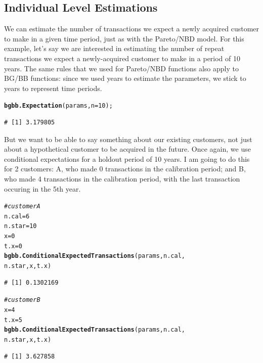 \documentclass[10pt, letterpaper, onecolumn, oneside, final]{article}\usepackage[]{graphicx}\usepackage[]{color}
\makeatletter
\newcommand{\hlnum}[1]{\textcolor[rgb]{0.686,0.059,0.569}{#1}}%
\newcommand{\hlcom}[1]{\textcolor[rgb]{0.678,0.584,0.686}{\textit{#1}}}%
\newcommand{\hlstd}[1]{\textcolor[rgb]{0.345,0.345,0.345}{#1}}%
\newcommand{\hlkwb}[1]{\textcolor[rgb]{0.69,0.353,0.396}{#1}}%
\newcommand{\hlkwc}[1]{\textcolor[rgb]{0.333,0.667,0.333}{#1}}%
\newcommand{\hlkwd}[1]{\textcolor[rgb]{0.737,0.353,0.396}{\textbf{#1}}}%
\newenvironment{kframe}{%
 \def\at@end@of@kframe{}%
 \ifinner\ifhmode%
  \def\at@end@of@kframe{\end{minipage}}%
  \begin{minipage}{\columnwidth}%
 \fi\fi%
 \def\FrameCommand##1{\hskip\@totalleftmargin \hskip-\fboxsep
 \colorbox{shadecolor}{##1}\hskip-\fboxsep
     \hskip-\linewidth \hskip-\@totalleftmargin \hskip\columnwidth}%
 \MakeFramed {\advance\hsize-\width
   \@totalleftmargin\z@ \linewidth\hsize
   \@setminipage}}%
 {\par\unskip\endMakeFramed%
 \at@end@of@kframe}
\newenvironment{knitrout}{}{} %
\makeatother
\begin{document}
\subsection{Individual Level Estimations}

We can estimate the number of transactions we expect a newly acquired
customer to make in a given time period, just as with the Pareto/NBD
model. For this example, let's say we are interested in estimating the
number of repeat transactions we expect a newly-acquired customer to
make in a period of 10 years. The same rules that we used for
Pareto/NBD functions also apply to BG/BB functions: since we used
years to estimate the parameters, we stick to years to represent time
periods.
\begin{knitrout}
\color{fgcolor}\begin{kframe}
\begin{alltt}
\hlkwd{bgbb.Expectation}\hlstd{(params,} \hlkwc{n}\hlstd{=}\hlnum{10}\hlstd{);}
\end{alltt}
\begin{verbatim}
# [1] 3.179805
\end{verbatim}
\end{kframe}
\end{knitrout}


But we want to be able to say something about our existing customers,
not just about a hypothetical customer to be acquired in the
future. Once again, we use conditional expectations for a holdout
period of 10 years. I am going to do this for 2 customers: A, who made
0 transactions in the calibration period; and B, who made 4
transactions in the calibration period, with the last transaction
occuring in the 5th year.

\begin{knitrout}
\color{fgcolor}\begin{kframe}
\begin{alltt}
\hlcom{# customer A}
\hlstd{n.cal} \hlkwb{=} \hlnum{6}
\hlstd{n.star} \hlkwb{=} \hlnum{10}
\hlstd{x} \hlkwb{=} \hlnum{0}
\hlstd{t.x} \hlkwb{=} \hlnum{0}
\hlkwd{bgbb.ConditionalExpectedTransactions}\hlstd{(params, n.cal,}
                                     \hlstd{n.star, x, t.x)}
\end{alltt}
\begin{verbatim}
# [1] 0.1302169
\end{verbatim}
\begin{alltt}
\hlcom{# customer B}
\hlstd{x} \hlkwb{=} \hlnum{4}
\hlstd{t.x} \hlkwb{=} \hlnum{5}
\hlkwd{bgbb.ConditionalExpectedTransactions}\hlstd{(params, n.cal,}
                                     \hlstd{n.star, x, t.x)}
\end{alltt}
\begin{verbatim}
# [1] 3.627858
\end{verbatim}
\end{kframe}
\end{knitrout}
\end{document}
